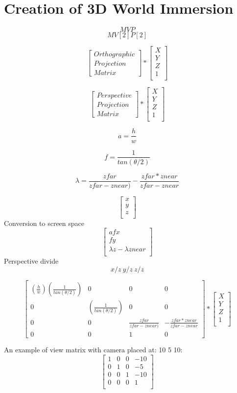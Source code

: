 \newpage
\section{Creation of 3D World Immersion}
\[MVP\]
\[MV[2]P[2]\]

\[
\begin{bmatrix}
Orthographic\\
Projection \\
Matrix
\end{bmatrix} 
*
\begin{bmatrix}
X\\
Y\\
Z\\
1\\
\end{bmatrix} 
\]

\[
\begin{bmatrix}
Perspective\\
Projection \\
Matrix
\end{bmatrix} 
*
\begin{bmatrix}
X\\
Y\\
Z\\
1\\
\end{bmatrix} 
\]

\[
a=\frac{h}{w}
\]

\[
f=\frac{1}{tan(\theta / 2)}
\]

\[
\lambda=\frac{zfar}{zfar - znear)}
-
\frac{zfar * znear}{zfar-znear}
\]

\[
\begin{bmatrix}
x\\
y\\
z\\
\end{bmatrix}
\]
Conversion to screen space
\[
\begin{bmatrix}
afx\\
fy\\
\lambda z-\lambda znear\\
\end{bmatrix}
\]
Perspective divide
\[
x/z\ y/z\ z/z
\]

\[
\begin{bmatrix}
(\frac{h}{w})(\frac{1}{tan(\theta/2)}) & 0 & 0 & 0\\
0 & (\frac{1}{tan(\theta/2)}) & 0 & 0\\
0 & 0 & \frac{zfar}{zfar - znear)} & -\frac{zfar * znear}{zfar-znear}\\
0 & 0 & 1 & 0
\end{bmatrix} 
*
\begin{bmatrix}
X\\
Y\\
Z\\
1\\
\end{bmatrix} 
\]

An example of view matrix with camera placed at: 10 5 10:
\[
\begin{bmatrix}
1 & 0 & 0 & -10\\
0 & 1 & 0 & -5\\
0 & 0 & 1 & -10\\
0 & 0 & 0 & 1\\
\end{bmatrix} 
\]